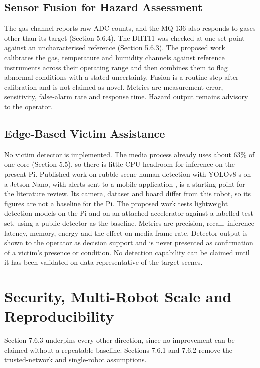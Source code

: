 \subsection{Sensor Fusion for Hazard Assessment}

The gas channel reports raw ADC counts, and the MQ-136 also responds to gases other than its target (Section 5.6.4). The DHT11 was checked at one set-point against an uncharacterised reference (Section 5.6.3). The proposed work calibrates the gas, temperature and humidity channels against reference instruments across their operating range and then combines them to flag abnormal conditions with a stated uncertainty. Fusion is a routine step after calibration and is not claimed as novel. Metrics are measurement error, sensitivity, false-alarm rate and response time. Hazard output remains advisory to the operator.

\subsection{Edge-Based Victim Assistance}

No victim detector is implemented. The media process already uses about 63\% of one core (Section 5.5), so there is little CPU headroom for inference on the present Pi. Published work on rubble-scene human detection with YOLOv8-s on a Jetson Nano, with alerts sent to a mobile application \cite{raghavan2026}, is a starting point for the literature review. Its camera, dataset and board differ from this robot, so its figures are not a baseline for the Pi. The proposed work tests lightweight detection models on the Pi and on an attached accelerator against a labelled test set, using a public detector as the baseline. Metrics are precision, recall, inference latency, memory, energy and the effect on media frame rate. Detector output is shown to the operator as decision support and is never presented as confirmation of a victim's presence or condition. No detection capability can be claimed until it has been validated on data representative of the target scenes.

\section{Security, Multi-Robot Scale and Reproducibility}

Section 7.6.3 underpins every other direction, since no improvement can be claimed without a repeatable baseline. Sections 7.6.1 and 7.6.2 remove the trusted-network and single-robot assumptions.

